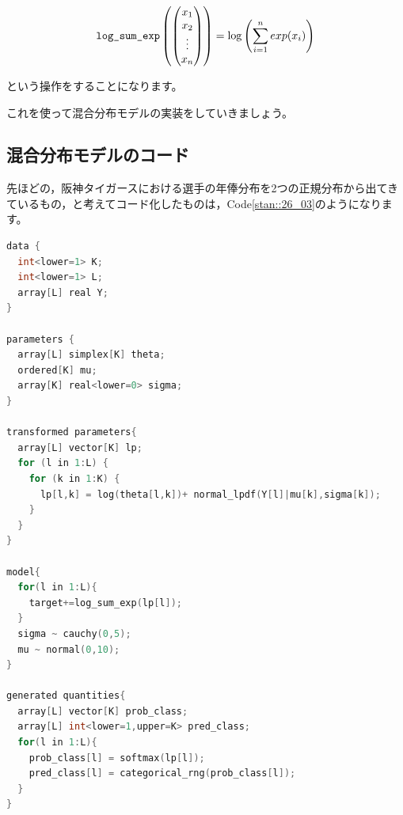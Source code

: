 \documentclass{ltjsbook}
\begin{document}
	\[ \verb|log_sum_exp|\left( \begin{pmatrix} x_1\\x_2\\ \vdots \\ x_n \end{pmatrix} \right) = \log\left(\sum_{i=1}^n exp(x_i) \right) \]

	という操作をすることになります。

	これを使って混合分布モデルの実装をしていきましょう。
	\subsection{混合分布モデルのコード}
	先ほどの，阪神タイガースにおける選手の年俸分布を2つの正規分布から出てきているもの，と考えてコード化したものは，Code\ref{stan::26_03}のようになります。
	\begin{lstlisting}[language=C++,label={stan::26_03},caption={混合正規モデル}]
data {
  int<lower=1> K;
  int<lower=1> L;
  array[L] real Y;
}

parameters {
  array[L] simplex[K] theta;
  ordered[K] mu;
  array[K] real<lower=0> sigma;
}

transformed parameters{
  array[L] vector[K] lp;
  for (l in 1:L) {
    for (k in 1:K) {
      lp[l,k] = log(theta[l,k])+ normal_lpdf(Y[l]|mu[k],sigma[k]);
    }
  }
}

model{
  for(l in 1:L){
    target+=log_sum_exp(lp[l]);
  }
  sigma ~ cauchy(0,5);
  mu ~ normal(0,10);
}

generated quantities{
  array[L] vector[K] prob_class;
  array[L] int<lower=1,upper=K> pred_class;
  for(l in 1:L){
    prob_class[l] = softmax(lp[l]);
    pred_class[l] = categorical_rng(prob_class[l]);
  }
}
\end{lstlisting}
\end{document}
